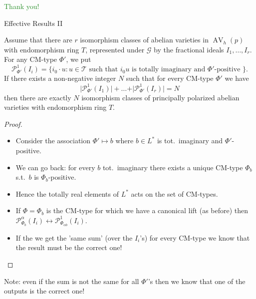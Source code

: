 \documentclass[usenames,dvipsnames]{beamer}
\DeclareMathOperator{\AV}{AV}
\newcommand{\cG}{\mathcal{G}}
\newcommand{\Palpha}[2]{\mathcal{P}^{\alpha}_{{#1}}({#2})}
\newcommand{\Pone}[2]{\mathcal{P}^{1}_{{#1}}({#2})}
\newcommand{\green}[1]{\textcolor{ForestGreen}{#1}}
\begin{document}
\begin{frame}[noframenumbering]{ }
	\begin{center}
		\green{\huge Thank you!}
	\end{center}
\end{frame}

\begin{frame}[noframenumbering]{ Effective Results II }
	\begin{theorem}[2]
    Assume that there are $r$ isomorphism classes of abelian varieties in $\AV_h(p)$ with endomorphism ring $T$, represented under $\cG$ by the fractional ideals  $I_1,\ldots,I_r$.
    For any CM-type $\Phi'$, we put
		\[ \Pone{\Phi'}{I_i}=\{ i_0 \cdot u: u \in \mathcal{T} \text{ such that } i_0 u \text{ is totally imaginary and $\Phi'$-positive } \}. \]
    If there exists a non-negative integer $N$ such that for every CM-type $\Phi'$ we have
    \[
    \vert \Pone{\Phi'}{I_1} \vert + \ldots + \vert \Pone{\Phi'}{I_r} \vert = N
    \]
    then there are exactly $N$ isomorphism classes of principally polarized abelian varieties with endomorphism ring $T$. 
	\end{theorem}
\end{frame}

\begin{frame}[noframenumbering]{ }
    \begin{proof}
    \begin{itemize}
    \item Consider the association $\Phi'\mapsto b$ where $b\in L^*$ is tot.~imaginary and $\Phi'$-positive.
    \item We can go back: for every $b$ tot.~imaginary there exists a unique CM-type $\Phi_b$ s.t.~$b$ is $\Phi_b$-positive.
    \item Hence the totally real elements of $L^*$ acts on the set of CM-types.
    \item If $\Phi=\Phi_{b}$ is the CM-type for which we have a canonical lift (as before)
        then $\Palpha{\Phi_b}{I_i} \longleftrightarrow \Pone{\Phi_{\alpha b}}{I_i}$.
    \item If the we get the 'same sum' (over the $I_i$'s) for every CM-type we know that the result must be the correct one! 
    \end{itemize}
    \end{proof} 
    Note: even if the sum is not the same for all $\Phi'$'s then we know that one of the outputs is the correct one!
\end{frame}
\end{document}
